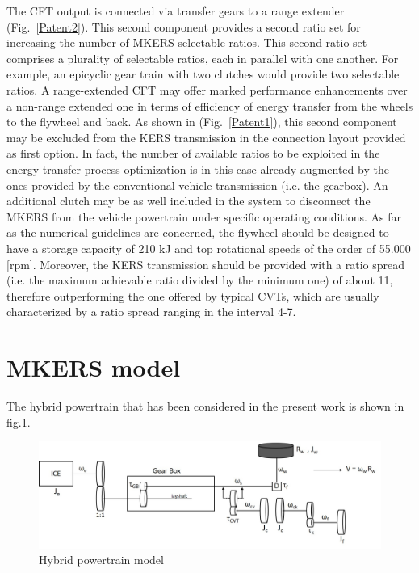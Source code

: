\documentclass[11pt]{article}
\begin{document}
The CFT output is connected via transfer gears to a range extender (Fig.~\ref{Patent2}). This second component provides a second ratio set for increasing the number of MKERS selectable ratios. This second ratio set comprises a plurality of selectable ratios, each in parallel with one another. For example, an epicyclic gear train with two clutches would provide two selectable ratios. A range-extended CFT may offer marked performance enhancements over a non-range extended one in terms of efficiency of energy transfer from the wheels to the flywheel and back.  As shown in (Fig.~\ref{Patent1}), this second component may be excluded from the KERS transmission in the connection layout provided as first option. In fact, the number of available ratios to be exploited in the energy transfer process optimization is in this case already augmented by the ones provided by the conventional vehicle transmission (i.e. the gearbox).  An additional clutch may be as well included in the system to disconnect the MKERS from the vehicle powertrain under specific operating conditions.
As far as the numerical guidelines are concerned, the flywheel should be designed to have a storage capacity of 210 kJ and top rotational speeds of the order of 55.000 [rpm]. Moreover, the KERS transmission should be provided with a ratio spread (i.e. the maximum achievable ratio divided by the minimum one) of about 11, therefore outperforming the one offered by typical CVTs, which are usually characterized by a ratio spread ranging in the interval 4-7.  

\section{MKERS model}

The hybrid powertrain that has been considered in the present work is shown in fig.\ref{model}.   

\begin{figure}[H]
\centering
\includegraphics[width=1\textwidth]{Images/Model/Model.jpg}
\caption{Hybrid powertrain model}
\label{model}
\end{figure}
\end{document}

